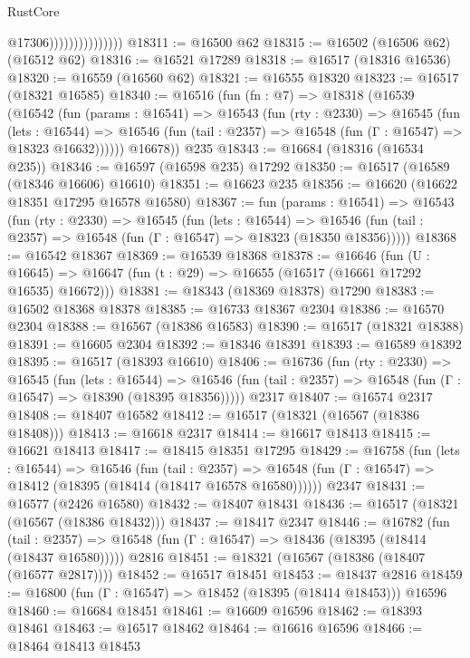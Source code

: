 \begin{lexlean}{RustCore}
\begin{coremodule}
                                  @17306)))))))))))))))
@18311 := @16500 @62
@18315 := @16502 (@16506 @62) (@16512 @62)
@18316 := @16521 @17289
@18318 := @16517 (@18316 @16536)
@18320 := @16559 (@16560 @62)
@18321 := @16555 @18320
@18323 := @16517 (@18321 @16585)
@18340 := @16516
    (fun (fn : @7) =>
    @18318
      (@16539
        (@16542
          (fun (params : @16541) =>
          @16543
            (fun (rty : @2330) =>
            @16545
              (fun (lets : @16544) =>
              @16546 (fun (tail : @2357) => @16548 (fun (Γ : @16547) => @18323 @16632))))))
        @16678))
    @235
@18343 := @16684 (@18316 (@16534 @235))
@18346 := @16597 (@16598 @235) @17292
@18350 := @16517 (@16589 (@18346 @16606) @16610)
@18351 := @16623 @235
@18356 := @16620 (@16622 @18351 @17295 @16578 @16580)
@18367 := fun (params : @16541) =>
  @16543
    (fun (rty : @2330) =>
    @16545
      (fun (lets : @16544) =>
      @16546 (fun (tail : @2357) => @16548 (fun (Γ : @16547) => @18323 (@18350 @18356)))))
@18368 := @16542 @18367
@18369 := @16539 @18368
@18378 := @16646
    (fun (U : @16645) => @16647 (fun (t : @29) => @16655 (@16517 (@16661 @17292 @16535) @16672)))
@18381 := @18343 (@18369 @18378) @17290
@18383 := @16502 @18368 @18378
@18385 := @16733 @18367 @2304
@18386 := @16570 @2304
@18388 := @16567 (@18386 @16583)
@18390 := @16517 (@18321 @18388)
@18391 := @16605 @2304
@18392 := @18346 @18391
@18393 := @16589 @18392
@18395 := @16517 (@18393 @16610)
@18406 := @16736
    (fun (rty : @2330) =>
    @16545
      (fun (lets : @16544) =>
      @16546 (fun (tail : @2357) => @16548 (fun (Γ : @16547) => @18390 (@18395 @18356)))))
    @2317
@18407 := @16574 @2317
@18408 := @18407 @16582
@18412 := @16517 (@18321 (@16567 (@18386 @18408)))
@18413 := @16618 @2317
@18414 := @16617 @18413
@18415 := @16621 @18413
@18417 := @18415 @18351 @17295
@18429 := @16758
    (fun (lets : @16544) =>
    @16546
      (fun (tail : @2357) =>
      @16548 (fun (Γ : @16547) => @18412 (@18395 (@18414 (@18417 @16578 @16580))))))
    @2347
@18431 := @16577 (@2426 @16580)
@18432 := @18407 @18431
@18436 := @16517 (@18321 (@16567 (@18386 @18432)))
@18437 := @18417 @2347
@18446 := @16782
    (fun (tail : @2357) => @16548 (fun (Γ : @16547) => @18436 (@18395 (@18414 (@18437 @16580)))))
    @2816
@18451 := @18321 (@16567 (@18386 (@18407 (@16577 @2817))))
@18452 := @16517 @18451
@18453 := @18437 @2816
@18459 := @16800 (fun (Γ : @16547) => @18452 (@18395 (@18414 @18453))) @16596
@18460 := @16684 @18451
@18461 := @16609 @16596
@18462 := @18393 @18461
@18463 := @16517 @18462
@18464 := @16616 @16596
@18466 := @18464 @18413 @18453

\end{coremodule}
\end{lexlean}
